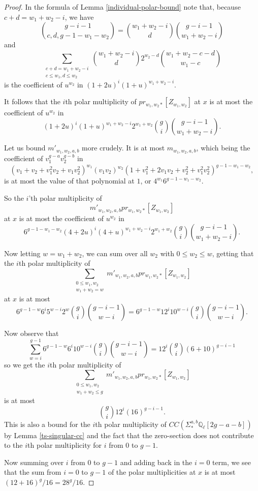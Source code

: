 \begin{proof}
In the formula of Lemma \ref{individual-polar-bound} note that, because  $c+d= w_1+w_2-i$, we have \[  {g-i-1 \choose c,d,g-1-w_1-w_2} = {w_1+w_2 -i  \choose d} {g-i-1 \choose w_1 + w_2 -i} \] and \[ \sum_{\substack{c+d = w_1+w_2 -i \\ c \leq w_1, d\leq w_2 }}{w_1+w_2 -i  \choose d}2^{w_2-d} {w_1 + w_2 -c -d \choose w_1 -c } \] is the coefficient of $u^{w_2}$ in  $(1+2u)^i  (1+u)^{w_1+w_2-i}$.

It follows that the $i$th polar multiplicity of $pr_{w_1,w_2 *} [ Z_{w_1,w_2} ] $ at $x$  is at most the coefficient of  $u^{w_2} $ in \[(1+2u)^i  (1+u)^{w_1+w_2-i}  2^{w_1+ w_2}  {g \choose i}    {g-i-1 \choose w_1 + w_2 -i}. \]

Let us bound $m'_{w_1,w_2,a,b}$ more crudely. It is at most $m_{w_1,w_2,a,b}$, which being the coefficient of $v_1^{g-a} v_2^{g-b}$  in\[  (v_1+ v_2+ v_1^2 v_2 + v_1 v_2^2 )^{w_1} (v_1v_2)^{w_2} ( 1  + v_1^2 + 2v_1 v_2 + v_2^2 + v_1^2 v_2^2 )^{g-1-w_1 -w_2} ,\] is at most the value of that polynomial at $1$, or  $4^{w_1} 6^{g-1-w_1-w_2}$.

So the $i$'th polar multiplicity of \[ m'_{w_1,w_2,a,b} pr_{w_1,w_2 *} [ Z_{w_1,w_2} ] \] at $x$ is at most the coefficient of $u^{w_2}$ in  \[ 6^{g-1-w_1 -w_2} (4+2u)^i  (4+u )^{w_1+w_2-i} 2^{w_1+w_2}  {g \choose i} {g-i-1 \choose w_1 + w_2 -i}. \]

Now letting $w=w_1+w_2$, we can sum over all $w_2$ with  $0 \leq w_2 \leq w$, getting that the $i$th polar multiplicity of \[ \sum_{\substack{0 \leq w_1,w_2\\ w_1+w_2 =w } }  m'_{w_1,w_2,a,b} pr_{w_1,w_2 *} [ Z_{w_1,w_2} ]\] at $x$ is at most \[ 6^{g-1-w} 6 ^i  5^{w-i} 2^w   {g \choose i}   {g-i-1 \choose w-i} =  6^{g-1-w} 12 ^i  10^{w-i}    {g \choose i}   {g-i-1 \choose w-i} . \]

Now observe that \[\sum_{w=i}^{g-1} 6^{g-1-w} 6^i  10^{w-i}  {g \choose i}    {g-i-1 \choose w-i} =  12^i {g\choose i}  ( 6 + 10)^{ g-i-1} \] so we get the $i$th polar multiplicity of \[ \sum_{\substack{ 0\leq w_1,w_2 \\ w_1+w_2 \leq g} }m'_{w_1,w_2,a,b} pr_{w_1,w_2 *} [ Z_{w_1,w_2} ]\] is at most \[   {g \choose i} 12^i (16)^{g-i-1}.\] This is also a bound for the $i$th polar multiplicity of $CC  ( \Sigma^{a,b}_* \mathbb Q_\ell[2g-a-b] )$ by Lemma \ref{ts-singular-cc} and the fact that the zero-section does not contribute to the $i$th polar multiplicity for $i$ from $0$ to $g-1$.

Now summing over $i$ from $0$ to $g-1$ and adding back in the $i=0$ term, we see that the sum from $i=0$ to $g-1$ of the polar multiplicities at $x$ is at most $ ( 12+ 16)^{g} / 16 = 28^g/ 16$.\end{proof}

